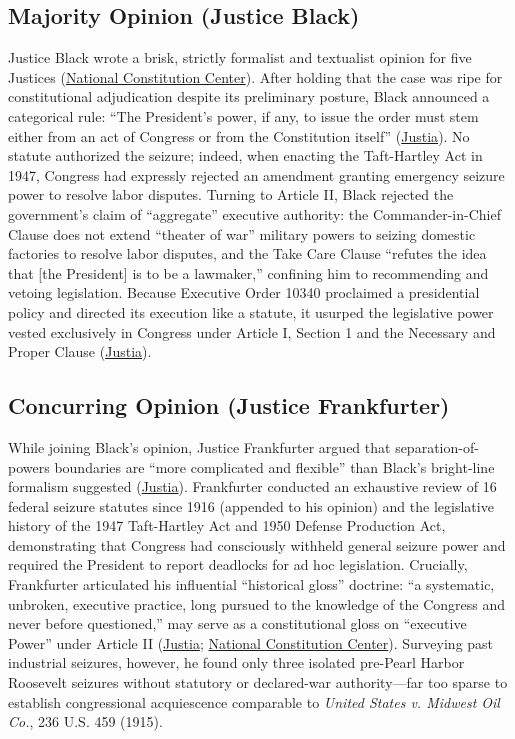 \documentclass[12pt]{article}
\begin{document}
\subsection{Majority Opinion (Justice Black)}
Justice Black wrote a brisk, strictly formalist and textualist opinion for five Justices (\href{https://constitutioncenter.org/blog/the-youngstown-case-three-approaches-to-interpreting-presidential-power}{National Constitution Center}). After holding that the case was ripe for constitutional adjudication despite its preliminary posture, Black announced a categorical rule: ``The President's power, if any, to issue the order must stem either from an act of Congress or from the Constitution itself'' (\href{https://supreme.justia.com/cases/federal/us/343/579/}{Justia}). No statute authorized the seizure; indeed, when enacting the Taft-Hartley Act in 1947, Congress had expressly rejected an amendment granting emergency seizure power to resolve labor disputes. Turning to Article II, Black rejected the government's claim of ``aggregate'' executive authority: the Commander-in-Chief Clause does not extend ``theater of war'' military powers to seizing domestic factories to resolve labor disputes, and the Take Care Clause ``refutes the idea that [the President] is to be a lawmaker,'' confining him to recommending and vetoing legislation. Because Executive Order 10340 proclaimed a presidential policy and directed its execution like a statute, it usurped the legislative power vested exclusively in Congress under Article I, Section 1 and the Necessary and Proper Clause (\href{https://supreme.justia.com/cases/federal/us/343/579/}{Justia}).

\subsection{Concurring Opinion (Justice Frankfurter)}
While joining Black's opinion, Justice Frankfurter argued that separation-of-powers boundaries are ``more complicated and flexible'' than Black's bright-line formalism suggested (\href{https://supreme.justia.com/cases/federal/us/343/579/}{Justia}). Frankfurter conducted an exhaustive review of 16 federal seizure statutes since 1916 (appended to his opinion) and the legislative history of the 1947 Taft-Hartley Act and 1950 Defense Production Act, demonstrating that Congress had consciously withheld general seizure power and required the President to report deadlocks for ad hoc legislation. Crucially, Frankfurter articulated his influential ``historical gloss'' doctrine: ``a systematic, unbroken, executive practice, long pursued to the knowledge of the Congress and never before questioned,'' may serve as a constitutional gloss on ``executive Power'' under Article II (\href{https://supreme.justia.com/cases/federal/us/343/579/}{Justia}; \href{https://constitutioncenter.org/blog/the-youngstown-case-three-approaches-to-interpreting-presidential-power}{National Constitution Center}). Surveying past industrial seizures, however, he found only three isolated pre-Pearl Harbor Roosevelt seizures without statutory or declared-war authority---far too sparse to establish congressional acquiescence comparable to \textit{United States v. Midwest Oil Co.}, 236 U.S. 459 (1915).
\end{document}
